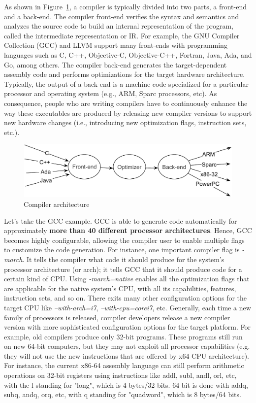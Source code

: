 As shown in Figure~\ref{fig:compilers}, a compiler is typically divided into two parts, a front-end and a back-end. The compiler front-end verifies the syntax and semantics and analyzes the source code to build an internal representation of the program, called the intermediate representation or IR. For example, the GNU Compiler Collection (GCC) and LLVM support many front-ends with programming languages such as C, C++, Objective-C, Objective-C++, Fortran, Java, Ada, and Go, among others. The compiler back-end generates the target-dependent assembly code and performs optimizations for the target hardware architecture. Typically, the output of a back-end is a machine code specialized for a particular processor and operating system (e.g., ARM, Sparc processors, etc).
As  consequence, people who are writing compilers have to continuously enhance the way these executables are produced by releasing new compiler versions to support new hardware changes (i.e., introducing new optimization flags, instruction sets, etc.). 
\begin{figure}[h]
	\center
	\includegraphics[scale=0.65]{Background/fig/compilers}
	\caption{Compiler architecture}
	\label{fig:compilers}
\end{figure}

Let's take the GCC example. GCC is able to generate code automatically for approximately \textbf{more than 40 different processor architectures}. Hence, GCC becomes highly configurable, allowing the compiler user to enable multiple flags to customize the code generation. For instance, one important compiler flag is \textit{-march}. It tells the compiler what code it should produce for the system's processor architecture (or arch); it tells GCC that it should produce code for a certain kind of CPU. Using \textit{-march=native} enables all the optimization flags that are applicable for the native system's CPU, with all its capabilities, features, instruction sets, and so on. There exits many other configuration options for the target CPU like \textit{--with-arch=i7}, \textit{--with-cpu=corei7}, etc.
Generally, each time a new family of processors is released, compiler developers release a new compiler version with more sophisticated configuration options for the target platform. For example, old compilers produce only 32-bit programs. These programs still run on new 64-bit computers, but they may not exploit all processor capabilities (e.g. they will not use the new instructions that are offered by x64 CPU architecture). For instance, the current x86-64 assembly language can still perform arithmetic operations on 32-bit registers using instructions like addl, subl, andl, orl, etc, with the l standing for "long", which is 4 bytes/32 bits. 64-bit  is done with addq, subq, andq, orq, etc, with q standing for "quadword", which is 8 bytes/64 bits.

